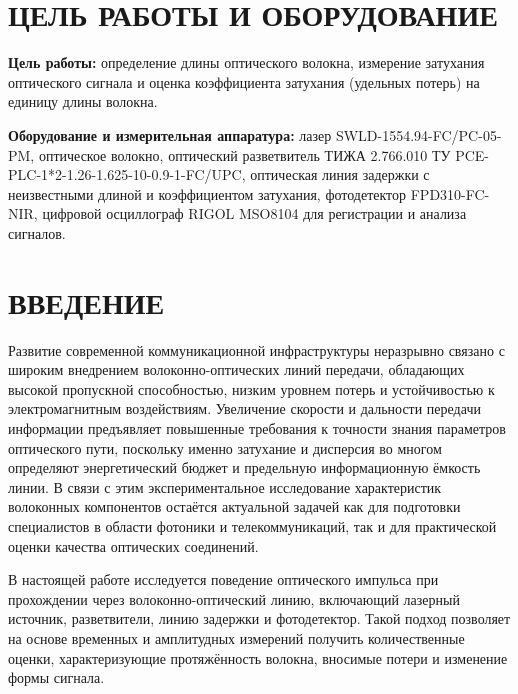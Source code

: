 \documentclass[14pt,a4paper]{extarticle}
\numberwithin{equation}{section}
\numberwithin{figure}{section}
\numberwithin{table}{section}
\begin{document}
 
\tableofcontents  


 \newpage
\section*{\centering ЦЕЛЬ РАБОТЫ И ОБОРУДОВАНИЕ}

\noindent \textbf{Цель работы:} определение длины оптического волокна, измерение затухания оптического сигнала и оценка коэффициента затухания (удельных потерь) на единицу длины волокна.

\vspace{1cm}

\noindent \textbf{Оборудование и измерительная аппаратура:} лазер SWLD-1554.94-FC/PC-05-PM, оптическое волокно, оптический разветвитель ТИЖА 2.766.010 ТУ PCE-PLC-1*2-1.26-1.625-10-0.9-1-FC/UPC, оптическая линия задержки с неизвестными длиной и коэффициентом затухания, фотодетектор FPD310-FC-NIR, цифровой осциллограф RIGOL MSO8104 для регистрации и анализа сигналов.







 
\section*{ВВЕДЕНИЕ}


Развитие современной коммуникационной инфраструктуры неразрывно связано с широким внедрением волоконно-оптических линий передачи, обладающих высокой пропускной способностью, низким уровнем потерь и устойчивостью к электромагнитным воздействиям. Увеличение скорости и дальности передачи информации предъявляет повышенные требования к точности знания параметров оптического пути, поскольку именно затухание и дисперсия во многом определяют энергетический бюджет и предельную информационную ёмкость линии. В связи с этим экспериментальное исследование характеристик волоконных компонентов остаётся актуальной задачей как для подготовки специалистов в области фотоники и телекоммуникаций, так и для практической оценки качества оптических соединений.


В настоящей работе исследуется поведение оптического импульса при прохождении через волоконно-оптический линию, включающий лазерный источник, разветвители, линию задержки и фотодетектор. Такой подход позволяет на основе временных и амплитудных измерений получить количественные оценки, характеризующие протяжённость волокна, вносимые потери и изменение формы сигнала.
\end{document}
